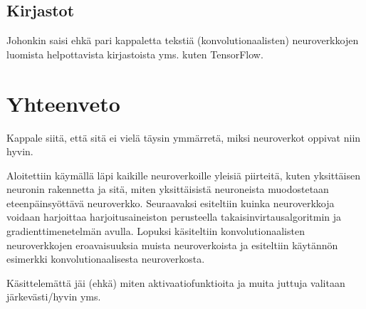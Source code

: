 \documentclass[finnish]{tktltiki2}
\theoremstyle{definition}
\theoremstyle{remark}
\begin{document}
  \subsection{Kirjastot}
  Johonkin saisi ehkä pari kappaletta tekstiä (konvolutionaalisten) neuroverkkojen luomista helpottavista kirjastoista yms. kuten TensorFlow.

\section{Yhteenveto} 

Kappale siitä, että sitä ei vielä täysin ymmärretä, miksi neuroverkot oppivat niin hyvin.

Aloitettiin käymällä läpi kaikille neuroverkoille yleisiä piirteitä, kuten yksittäisen neuronin rakennetta ja sitä, miten yksittäisistä neuroneista muodostetaan eteenpäinsyöttävä neuroverkko. Seuraavaksi esiteltiin kuinka neuroverkkoja voidaan harjoittaa harjoitusaineiston perusteella takaisinvirtausalgoritmin ja gradienttimenetelmän avulla. Lopuksi käsiteltiin konvolutionaalisten neuroverkkojen eroavaisuuksia muista neuroverkoista ja esiteltiin käytännön esimerkki konvolutionaalisesta neuroverkosta.

Käsittelemättä jäi (ehkä) miten aktivaatiofunktioita ja muita juttuja valitaan järkevästi/hyvin yms.







  
  





  
\end{document}
